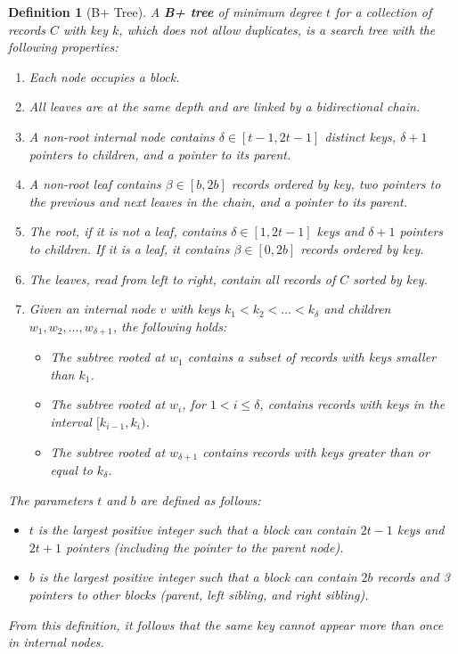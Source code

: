 \documentclass{report}
\newtheorem{defin}{Definition}[chapter]
\begin{document}
\begin{defin}[B+ Tree] A \textbf{B+ tree} of minimum degree \( t \) for a collection of records \( C \) with key \( k \), which does not allow duplicates, is a search tree with the following properties:
\begin{enumerate}
    \item Each node occupies a block.
    \item All leaves are at the same depth and are linked by a bidirectional chain.
    \item A non-root internal node contains \( \delta \in [t - 1, 2t - 1] \) distinct keys, \( \delta + 1 \) pointers to children, and a pointer to its parent.
    \item A non-root leaf contains \( \beta \in [b, 2b] \) records ordered by key, two pointers to the previous and next leaves in the chain, and a pointer to its parent.
    \item The root, if it is not a leaf, contains \( \delta \in [1, 2t -1] \) keys and \( \delta +1 \) pointers to children.  
          If it is a leaf, it contains \( \beta \in [0, 2b] \) records ordered by key.
    \item The leaves, read from left to right, contain all records of \( C \) sorted by key.
    \item Given an internal node \( v \) with keys \( k_1 < k_2 < \dots < k_{\delta} \) and children \( w_1, w_2, \dots, w_{\delta+1} \), the following holds:
    \begin{itemize}
        \item The subtree rooted at \( w_1 \) contains a subset of records with keys smaller than \( k_1 \).
        \item The subtree rooted at \( w_i \), for \( 1 < i \leq \delta \), contains records with keys in the interval \( [k_{i-1}, k_i) \).
        \item The subtree rooted at \( w_{\delta+1} \) contains records with keys greater than or equal to \( k_{\delta} \).
    \end{itemize}
\end{enumerate}
\noindent The parameters \( t \) and \( b \) are defined as follows:
\begin{itemize}
    \item \( t \) is the largest positive integer such that a block can contain \( 2t - 1 \) keys and \( 2t + 1 \) pointers (including the pointer to the parent node).
    \item \( b \) is the largest positive integer such that a block can contain \( 2b \) records and 3 pointers to other blocks (parent, left sibling, and right sibling).
\end{itemize}
\noindent
From this definition, it follows that the same key cannot appear more than once in internal nodes.
\end{defin}
\end{document}
